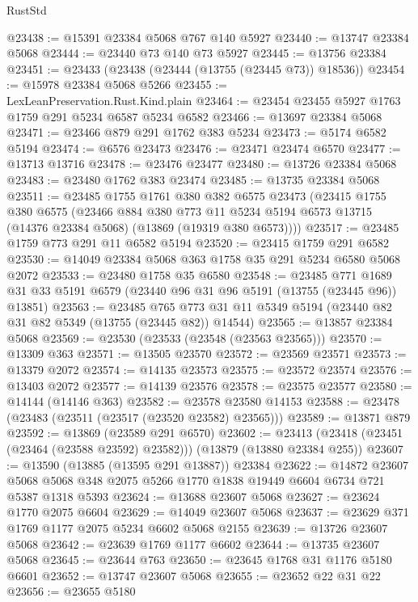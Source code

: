\begin{lexlean}{RustStd}
\begin{coremodule}
@23438 := @15391 @23384 @5068 @767 @140 @5927
@23440 := @13747 @23384 @5068
@23444 := @23440 @73 @140 @73 @5927
@23445 := @13756 @23384
@23451 := @23433 (@23438 (@23444 (@13755 (@23445 @73)) @18536))
@23454 := @15978 @23384 @5068 @5266
@23455 := LexLeanPreservation.Rust.Kind.plain
@23464 := @23454 @23455 @5927 @1763 @1759 @291 @5234 @6587 @5234 @6582
@23466 := @13697 @23384 @5068
@23471 := @23466 @879 @291 @1762 @383 @5234
@23473 := @5174 @6582 @5194
@23474 := @6576 @23473
@23476 := @23471 @23474 @6570
@23477 := @13713 @13716
@23478 := @23476 @23477
@23480 := @13726 @23384 @5068
@23483 := @23480 @1762 @383 @23474
@23485 := @13735 @23384 @5068
@23511 := @23485
    @1755
    @1761
    @380
    @382
    @6575
    @23473
    (@23415
      @1755
      @380
      @6575
      (@23466
        @884
        @380
        @773
        @11
        @5234
        @5194
        @6573
        @13715
        (@14376 @23384 @5068)
        (@13869 (@19319 @380 @6573))))
@23517 := @23485 @1759 @773 @291 @11 @6582 @5194
@23520 := @23415 @1759 @291 @6582
@23530 := @14049 @23384 @5068 @363 @1758 @35 @291 @5234 @6580 @5068 @2072
@23533 := @23480 @1758 @35 @6580
@23548 := @23485
    @771
    @1689
    @31
    @33
    @5191
    @6579
    (@23440 @96 @31 @96 @5191 (@13755 (@23445 @96)) @13851)
@23563 := @23485
    @765
    @773
    @31
    @11
    @5349
    @5194
    (@23440 @82 @31 @82 @5349 (@13755 (@23445 @82)) @14544)
@23565 := @13857 @23384 @5068
@23569 := @23530 (@23533 (@23548 (@23563 @23565)))
@23570 := @13309 @363
@23571 := @13505 @23570
@23572 := @23569 @23571
@23573 := @13379 @2072
@23574 := @14135 @23573
@23575 := @23572 @23574
@23576 := @13403 @2072
@23577 := @14139 @23576
@23578 := @23575 @23577
@23580 := @14144 (@14146 @363)
@23582 := @23578 @23580 @14153
@23588 := @23478 (@23483 (@23511 (@23517 (@23520 @23582) @23565)))
@23589 := @13871 @879
@23592 := @13869 (@23589 @291 @6570)
@23602 := @23413 (@23418 (@23451 (@23464 (@23588 @23592) @23582))) (@13879 (@13880 @23384 @255))
@23607 := @13590 (@13885 (@13595 @291 @13887)) @23384
@23622 := @14872
    @23607
    @5068
    @5068
    @348
    @2075
    @5266
    @1770
    @1838
    @19449
    @6604
    @6734
    @721
    @5387
    @1318
    @5393
@23624 := @13688 @23607 @5068
@23627 := @23624 @1770 @2075 @6604
@23629 := @14049 @23607 @5068
@23637 := @23629 @371 @1769 @1177 @2075 @5234 @6602 @5068 @2155
@23639 := @13726 @23607 @5068
@23642 := @23639 @1769 @1177 @6602
@23644 := @13735 @23607 @5068
@23645 := @23644 @763
@23650 := @23645 @1768 @31 @1176 @5180 @6601
@23652 := @13747 @23607 @5068
@23655 := @23652 @22 @31 @22
@23656 := @23655 @5180

\end{coremodule}
\end{lexlean}
